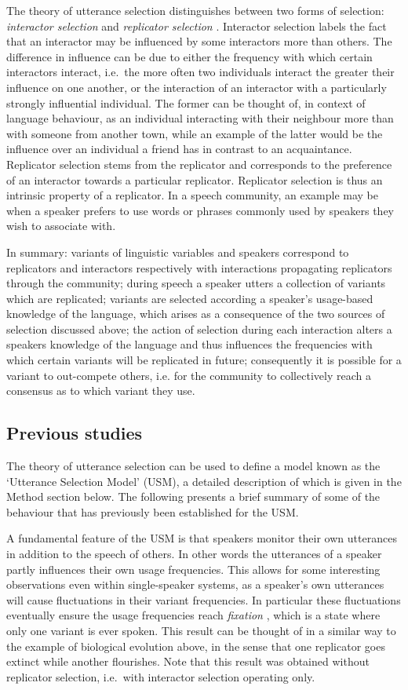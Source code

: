 \documentclass[12pt]{article}
\begin{document}
The theory of utterance selection distinguishes between two forms of selection: \emph{interactor selection} and \emph{replicator selection} \cite{croft}. Interactor selection labels the fact that an interactor may be influenced by some interactors more than others. The difference in influence can be due to either the frequency with which certain interactors interact, i.e.\ the more often two individuals interact the greater their influence on one another, or the interaction of an interactor with a particularly strongly influential individual. The former can be thought of, in context of language behaviour, as an individual interacting with their neighbour more than with someone from another town, while an example of the latter would be the influence over an individual a friend has in contrast to an acquaintance. Replicator selection stems from the replicator and corresponds to the preference of an interactor towards a particular replicator. Replicator selection is thus an intrinsic property of a replicator. In a speech community, an example may be when a speaker prefers to use words or phrases commonly used by speakers they wish to associate with. 

In summary: variants of linguistic variables and speakers correspond to replicators and interactors respectively with interactions propagating replicators through the community; during speech a speaker utters a collection of variants which are replicated; variants are selected according a speaker's usage-based knowledge of the language, which arises as a consequence of the two sources of selection discussed above; the action of selection during each interaction alters a speakers knowledge of the language and thus influences the frequencies with which certain variants will be replicated in future; consequently it is possible for a variant to out-compete others, i.e. for the community to collectively reach a consensus as to which variant they use.

\subsection{Previous studies}
The theory of utterance selection can be used to define a model known as the `Utterance Selection Model' (USM), a detailed description of which is given in the Method section below. The following presents a brief summary of some of the behaviour that has previously been established for the USM. 

A fundamental feature of the USM is that speakers monitor their own utterances in addition to the speech of others. In other words the utterances of a speaker partly influences their own usage frequencies. This allows for some interesting observations even within single-speaker systems, as a speaker's own utterances will cause fluctuations in their variant frequencies. In particular these fluctuations eventually ensure the usage frequencies reach \emph{fixation} \cite{USM}, which is a state where only one variant is ever spoken. This result can be thought of in a similar way to the example of biological evolution above, in the sense that one replicator goes extinct while another flourishes. Note that this result was obtained without replicator selection, i.e.\ with interactor selection operating only. 
\end{document}
